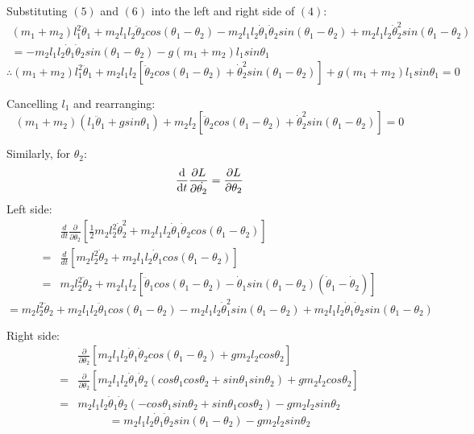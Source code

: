 \documentclass[a4paper,12pt]{article}
\begin{document}
Substituting $(5)$ and $(6)$ into the left and right side of $(4)$:
\begin{multline*}
    (m_1+m_2)l_1^2\ddot\theta_1+m_2l_1l_2\ddot\theta_2cos(\theta_1-\theta_2)-m_2l_1l_2\dot\theta_1\dot\theta_2sin(\theta_1-\theta_2)+m_2l_1l_2\dot\theta_2^2sin(\theta_1-\theta_2)
    \\=-m_2l_1l_2\dot\theta_1 \dot\theta_2sin(\theta_1-\theta_2)
    -g(m_1+m_2)l_1sin\theta_1
\end{multline*}
\[
    \therefore(m_1+m_2)l_1^2\ddot\theta_1+m_2l_1l_2[\ddot\theta_2cos(\theta_1-\theta_2)+\dot\theta_2^2sin(\theta_1-\theta_2)]+g(m_1+m_2)l_1sin\theta_1=0
\]

Cancelling $l_1$ and rearranging:
\begin{equation}
    (m_1+m_2)(l_1\ddot\theta_1+gsin\theta_1)+m_2l_2[\ddot\theta_2cos(\theta_1-\theta_2)+\dot\theta_2^2sin(\theta_1-\theta_2)] =0
\end{equation}

Similarly, for $\theta_2$:
\begin{equation}\dv{}{t}\frac{\partial L}{\partial \dot{\theta_2}}=\frac{\partial L}{\partial \theta_2}\end{equation}
Left side: 
\begin{align*}
    &\frac{d}{dt}\frac{\partial}{\partial \dot{\theta_2}}[\frac{1}{2}m_2l_2^2\dot\theta_2^2+m_2l_1l_2\dot\theta_1\dot\theta_2cos(\theta_1-\theta_2)]
    \\
    ={}&\frac{d}{dt}[m_2l_2^2\dot\theta_2+m_2l_1l_2\dot\theta_1cos(\theta_1-\theta_2)]
    \\
    ={}&m_2l_2^2\ddot\theta_2+m_2l_1l_2[\ddot\theta_1cos(\theta_1-\theta_2)-\dot\theta_1sin(\theta_1-\theta_2)(\dot\theta_1-\dot\theta_2)]
\end{align*}
\begin{equation}
    =m_2l_2^2\ddot\theta_2+m_2l_1l_2\ddot\theta_1cos(\theta_1-\theta_2)-m_2l_1l_2\dot\theta_1^2sin(\theta_1-\theta_2)+m_2l_1l_2\dot\theta_1\dot\theta_2sin(\theta_1-\theta_2)
\end{equation}

Right side:
\begin{align*}
    &\frac{\partial}{\partial \theta_2}[m_2l_1l_2\dot\theta_1\dot\theta_2cos(\theta_1-\theta_2)+gm_2l_2cos\theta_2]
    \\
    ={}&\frac{\partial}{\partial \theta_2}[m_2l_1l_2\dot\theta_1\dot\theta_2(cos\theta_1 cos\theta_2+sin\theta_1 sin\theta_2)+gm_2l_2cos\theta_2]
    \\
    ={}&m_2l_1l_2\dot\theta_1\dot\theta_2(-cos\theta_1 sin\theta_2+sin\theta_1 cos\theta_2)-gm_2l_2sin\theta_2
\end{align*}
\begin{equation}
    =m_2l_1l_2\dot\theta_1\dot\theta_2sin(\theta_1-\theta_2)-gm_2l_2sin\theta_2
\end{equation}
\end{document}
